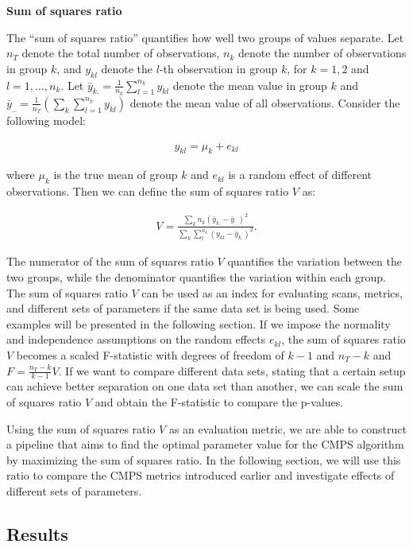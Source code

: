 \textbf{Sum of squares ratio}

The ``sum of squares ratio'' quantifies how well two groups of values
separate. Let \(n_T\) denote the total number of observations, \(n_k\)
denote the number of observations in group \(k\), and \(y_{kl}\) denote
the \(l\)-th observation in group \(k\), for \(k = 1,2\) and
\(l = 1, \dots, n_k\). Let
\(\bar{y}_{k.} = \frac{1}{n_k} \sum_{l=1}^{n_k} y_{kl}\) denote the mean
value in group \(k\) and
\(\bar{y}_{..} = \frac{1}{n_T} \left( \sum_{k} \sum_{l = 1}^{n_k} y_{kl} \right)\)
denote the mean value of all observations. Consider the following model:

\begin{align}
y_{kl} = \mu_k + e_{kl}
\end{align}

where \(\mu_k\) is the true mean of group \(k\) and \(e_{kl}\) is a
random effect of different observations. Then we can define the sum of
squares ratio \(V\) as:

\begin{align}
V = \frac{\sum_k n_k (\bar{y}_{k.} - \bar{y}_{..})^2}{\sum_k \sum_l^{n_k} (y_{kl} - \bar{y}_{k.})^2 }.
\end{align}

The numerator of the sum of squares ratio \(V\) quantifies the variation
between the two groups, while the denominator quantifies the variation
within each group. The sum of squares ratio \(V\) can be used as an
index for evaluating scans, metrics, and different sets of parameters if
the same data set is being used. Some examples will be presented in the
following section. If we impose the normality and independence
assumptions on the random effects \(e_{kl}\), the sum of squares ratio
\(V\) becomes a scaled F-statistic with degrees of freedom of \(k-1\)
and \(n_T - k\) and \(F = \frac{n_T - k}{k- 1} V\). If we want to
compare different data sets, stating that a certain setup can achieve
better separation on one data set than another, we can scale the sum of
squares ratio \(V\) and obtain the F-statistic to compare the p-values.

Using the sum of squares ratio \(V\) as an evaluation metric, we are
able to construct a pipeline that aims to find the optimal parameter
value for the CMPS algorithm by maximizing the sum of squares ratio. In
the following section, we will use this ratio to compare the CMPS
metrics introduced earlier and investigate effects of different sets of
parameters.

\hypertarget{results}{%
\subsection{Results}\label{results}}

